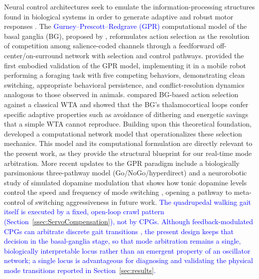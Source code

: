 \documentclass[preprint,12pt]{elsarticle}
\newcommand{\revblue}[1]{\textcolor{blue}{#1}}
\begin{document}
Neural control architectures seek to emulate the information-processing structures found in biological systems in order to generate adaptive and robust motor responses \citep{mead1990neuromorphic,ijspeert2008}. The \revblue{Gurney--Prescott--Redgrave (GPR)} computational model of the basal ganglia (BG), proposed by \citet{Gurney2001a,Gurney2001b}, reformulates action selection as the resolution of competition among salience-coded channels through a feedforward off-center/on-surround network with selection and control pathways. \citet{Prescott2006Robot} provided the first embodied validation of the GPR model, implementing it in a mobile robot performing a foraging task with five competing behaviors, demonstrating clean switching, appropriate behavioral persistence, and conflict-resolution dynamics analogous to those observed in animals. \citet{Girard2003Basal} compared BG-based action selection against a classical WTA and showed that the BG's thalamocortical loops confer specific adaptive properties such as avoidance of dithering and energetic savings that a simple WTA cannot reproduce. Building upon this theoretical foundation, \citet{sarvestani2013computational} developed a computational network model that operationalizes these selection mechanics. This model and its computational formulation are directly relevant to the present work, as they provide the structural blueprint for our real-time mode arbitration. More recent updates to the GPR paradigm include a biologically parsimonious three-pathway model (Go/NoGo/hyperdirect) \citep{Baston2015Biologically} and a neurorobotic study of simulated dopamine modulation that shows how tonic dopamine levels control the speed and frequency of mode switching \citep{Prescott2024Simulated}, opening a pathway to meta-control of switching aggressiveness in future work. \revblue{The quadrupedal walking gait itself is executed by a fixed, open-loop crawl pattern (Section~\ref{ssec:ServoCompensation}), not by CPGs. Although feedback-modulated CPGs can arbitrate discrete gait transitions \citep{Fukui2019VestibularCPG,Owaki2017SpontaneousGait}, the present design keeps that decision in the basal-ganglia stage, so that mode arbitration remains a single, biologically interpretable locus rather than an emergent property of an oscillator network; a single locus is advantageous for diagnosing and validating the physical mode transitions reported in Section~\ref{sec:results}.}
\end{document}

